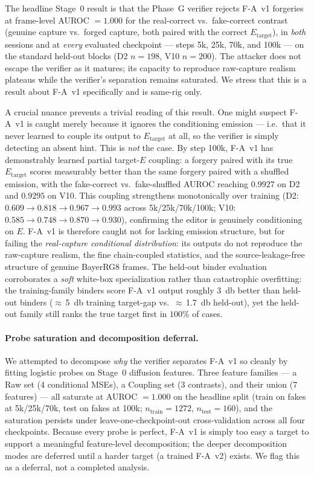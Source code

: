 The headline Stage~0 result is that the Phase~G verifier rejects F-A~v1 forgeries at frame-level AUROC $=1.000$ for the real-correct vs.\ fake-correct contrast (genuine capture vs.\ forged capture, both paired with the correct $E_{\mathrm{target}}$), in \emph{both} sessions and at \emph{every} evaluated checkpoint --- steps 5k, 25k, 70k, and 100k --- on the standard held-out blocks (D2 $n=198$, V10 $n=200$). The attacker does not escape the verifier as it matures; its capacity to reproduce raw-capture realism plateaus while the verifier's separation remains saturated. We stress that this is a result about F-A~v1 specifically and is same-rig only.

A crucial nuance prevents a trivial reading of this result. One might suspect F-A~v1 is caught merely because it ignores the conditioning emission --- i.e.\ that it never learned to couple its output to $E_{\mathrm{target}}$ at all, so the verifier is simply detecting an absent hint. This is \emph{not} the case. By step 100k, F-A~v1 has demonstrably learned partial target-$E$ coupling: a forgery paired with its true $E_{\mathrm{target}}$ scores measurably better than the same forgery paired with a shuffled emission, with the fake-correct vs.\ fake-shuffled AUROC reaching $0.9927$ on D2 and $0.9295$ on V10. This coupling strengthens monotonically over training (D2: $0.609\!\to\!0.818\!\to\!0.967\!\to\!0.993$ across 5k/25k/70k/100k; V10: $0.585\!\to\!0.748\!\to\!0.870\!\to\!0.930$), confirming the editor is genuinely conditioning on $E$. F-A~v1 is therefore caught not for lacking emission structure, but for failing the \emph{real-capture conditional distribution}: its outputs do not reproduce the raw-capture realism, the fine chain-coupled statistics, and the source-leakage-free structure of genuine BayerRG8 frames. The held-out binder evaluation corroborates a \emph{soft} white-box specialization rather than catastrophic overfitting: the training-family binders score F-A~v1 output roughly \SI{3}{\decibel} better than held-out binders ($\approx$\,\SI{5}{\decibel} training target-gap vs.\ $\approx$\,\SI{1.7}{\decibel} held-out), yet the held-out family still ranks the true target first in $100\%$ of cases.

\paragraph{Probe saturation and decomposition deferral.}
We attempted to decompose \emph{why} the verifier separates F-A~v1 so cleanly by fitting logistic probes on Stage~0 diffusion features. Three feature families --- a Raw set (4 conditional MSEs), a Coupling set (3 contrasts), and their union (7 features) --- all saturate at AUROC $=1.000$ on the headline split (train on fakes at 5k/25k/70k, test on fakes at 100k; $n_{\mathrm{train}}=1272$, $n_{\mathrm{test}}=160$), and the saturation persists under leave-one-checkpoint-out cross-validation across all four checkpoints. Because every probe is perfect, F-A~v1 is simply too easy a target to support a meaningful feature-level decomposition; the deeper decomposition modes are deferred until a harder target (a trained F-A~v2) exists. We flag this as a deferral, not a completed analysis.

